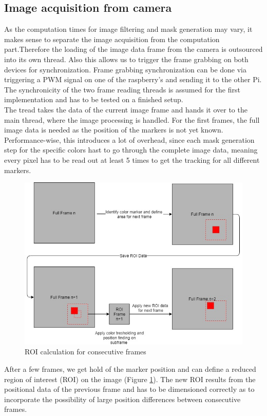 \subsection{Image acquisition from camera}
As the computation times for image filtering and mask generation may vary, it makes sense to separate the image acquisition from the computation part.Therefore the loading of the image data frame from the camera is outsourced into its own thread. Also this allows us to trigger the frame grabbing on both devices for synchronization. Frame grabbing synchronization can be done via triggering a PWM signal on one of the raspberry's and sending it to the other Pi.
The synchronicity of the two frame reading threads is assumed for the first implementation and has to be tested on a finished setup.\\
The tread takes the data of the current image frame and hands it over to the main thread, where the image processing is handled. For the first frames, the full image data is needed as the position of the markers is not yet known. Performance-wise, this introduces a lot of overhead, since each mask generation step for the specific colors hast to go through the complete image data, meaning every pixel has to be read out at least 5 times to get the tracking for all different markers.\\
\begin{figure}[H]
\includegraphics[width=\textwidth]{images/ROI.jpg}
\caption{ROI calculation for consecutive frames}
\label{roi_calc} 
\end{figure}
After a few frames, we get hold of the marker position and can define a reduced region of interest (ROI) on the image (Figure \ref{roi_calc}). The new ROI results from the positional data of the previous frame and has to be dimensioned correctly as to incorporate the possibility of large position differences between consecutive frames.\\
